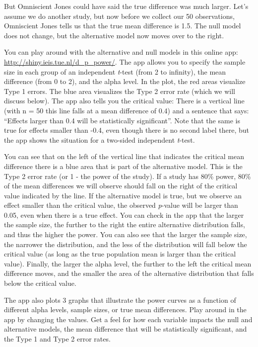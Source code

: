 \documentclass[
  oneside]{book}
\begin{document}
But Omniscient Jones could have said the true difference was much larger. Let's assume we do another study, but now before we collect our 50 observations, Omniscient Jones tells us that the true mean difference is 1.5. The null model does not change, but the alternative model now moves over to the right.



You can play around with the alternative and null models in this online app: \url{http://shiny.ieis.tue.nl/d_p_power/}. The app allows you to specify the sample size in each group of an independent \emph{t}-test (from 2 to infinity), the mean difference (from 0 to 2), and the alpha level. In the plot, the red areas visualize Type 1 errors. The blue area visualizes the Type 2 error rate (which we will discuss below). The app also tells you the critical value: There is a vertical line (with n = 50 this line falls at a mean difference of 0.4) and a sentence that says: ``Effects larger than 0.4 will be statistically significant''. Note that the same is true for effects smaller than -0.4, even though there is no second label there, but the app shows the situation for a two-sided independent \emph{t}-test.

You can see that on the left of the vertical line that indicates the critical mean difference there is a blue area that is part of the alternative model. This is the Type 2 error rate (or 1 - the power of the study). If a study has 80\% power, 80\% of the mean differences we will observe should fall on the right of the critical value indicated by the line. If the alternative model is true, but we observe an effect smaller than the critical value, the observed \emph{p}-value will be larger than 0.05, even when there is a true effect. You can check in the app that the larger the sample size, the further to the right the entire alternative distribution falls, and thus the higher the power. You can also see that the larger the sample size, the narrower the distribution, and the less of the distribution will fall below the critical value (as long as the true population mean is larger than the critical value). Finally, the larger the alpha level, the further to the left the critical mean difference moves, and the smaller the area of the alternative distribution that falls below the critical value.

The app also plots 3 graphs that illustrate the power curves as a function of different alpha levels, sample sizes, or true mean differences. Play around in the app by changing the values. Get a feel for how each variable impacts the null and alternative models, the mean difference that will be statistically significant, and the Type 1 and Type 2 error rates.
\end{document}
